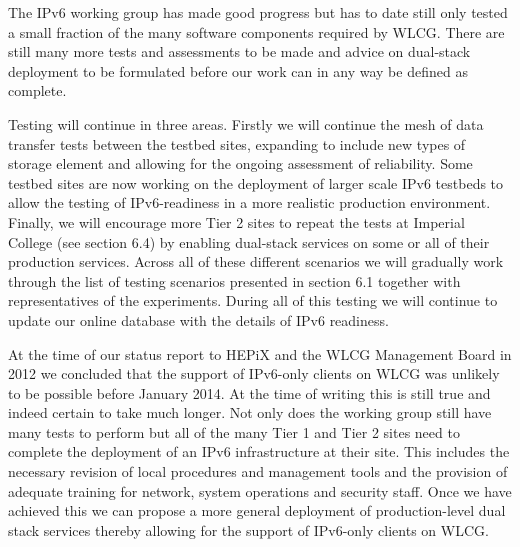 The IPv6 working group has made good progress but has to date still only tested a small fraction of the many 
software components required by WLCG. There are still many more tests and 
assessments to be made and advice on dual-stack deployment to be formulated before 
our work can in any way be defined as complete.

Testing will continue in three areas. Firstly we will continue the mesh of data transfer tests between
the testbed sites, expanding to include new types of storage element and allowing for the ongoing
assessment of reliability. Some testbed sites are now working on the deployment of larger scale IPv6 testbeds
to allow the testing of IPv6-readiness in a more realistic production environment. Finally, we will encourage 
more Tier 2 sites to repeat the
tests at Imperial College (see section 6.4) by enabling dual-stack services on some or all of their production
services. Across all of these different scenarios we will gradually work through the list of testing scenarios presented
in section 6.1 together with representatives of the experiments.  During all of this testing we
will continue to update our online database with the details of IPv6 readiness.

At the time of our status report to HEPiX and the WLCG Management Board in 2012 we concluded that
the support of IPv6-only clients on WLCG was unlikely to be possible before January 2014. At the time of writing this is still true and indeed certain to take much longer. Not only does the working group still have many tests to perform
but all of the many Tier 1 and Tier 2 sites need to complete the deployment of an IPv6 infrastructure at their site. This includes
the necessary revision of local procedures and management tools and the provision of adequate training for network,
system operations and security staff. Once we have achieved this we can propose a more general deployment of 
production-level dual stack services thereby allowing for the support of IPv6-only clients on WLCG.
